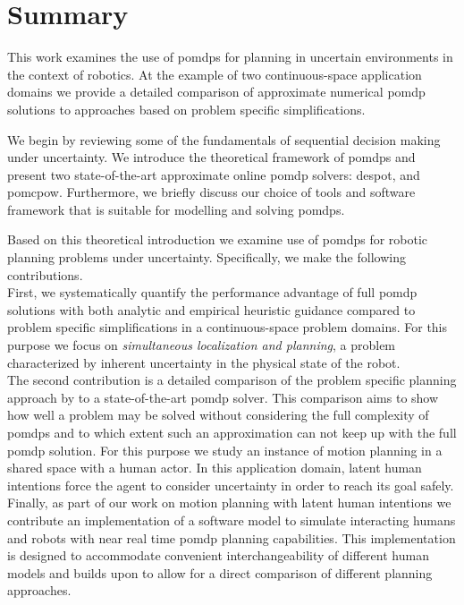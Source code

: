 \chapter{Summary}\label{chap:summary}

This work examines the use of \acfp{pomdp} for planning in uncertain
environments in the context of robotics. At the example of two continuous-space
application domains we provide a detailed comparison of approximate numerical
\ac{pomdp} solutions to approaches based on problem specific simplifications.

We begin by reviewing some of the fundamentals of sequential decision making
under uncertainty. We introduce the theoretical framework of \acp{pomdp} and
present two state-of-the-art approximate online \ac{pomdp} solvers:
\acf{despot}, and \acf{pomcpow}. Furthermore, we briefly discuss our choice of
tools and software framework that is suitable for modelling and solving
\acp{pomdp}.

Based on this theoretical introduction we examine use of \acp{pomdp} for
robotic planning problems under uncertainty. Specifically, we make the
following contributions.\\
First, we systematically quantify the performance
advantage of full \ac{pomdp} solutions with both analytic and empirical
heuristic guidance compared to problem specific simplifications in a
continuous-space problem domains. For this purpose we focus on
\emph{simultaneous localization and planning}, a problem characterized by
inherent uncertainty in the physical state of the robot.\\
The second contribution is a detailed comparison of the problem specific
planning approach by \cite{fisac2018probabilistically} to a state-of-the-art
\ac{pomdp} solver. This comparison aims to show how well a problem may be
solved without considering the full complexity of \acp{pomdp} and to which
extent such an approximation can not keep up with the full \ac{pomdp} solution.
For this purpose we study an instance of motion planning in a shared space with
a human actor. In this application domain, latent human intentions force the
agent to consider uncertainty in order to reach its goal safely.\\
Finally, as part of our work on motion planning with latent human intentions
we contribute an implementation of a software model to simulate
interacting humans and robots with near real time \ac{pomdp} planning
capabilities. This implementation is designed to accommodate convenient
interchangeability of different human models and builds upon \pomdpsjl to allow
for a direct comparison of different planning approaches.


